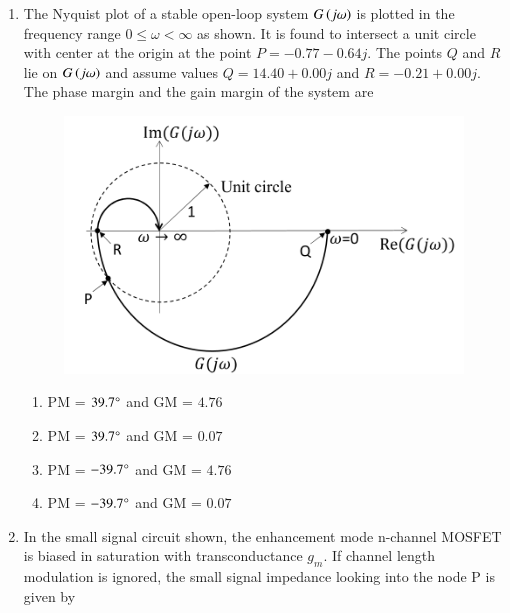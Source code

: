 \documentclass[journal,12pt,onecolumn]{IEEEtran}
\theoremstyle{remark}
\begin{document}
\begin{enumerate}
\item The Nyquist plot of a stable open-loop system $G\left(j\omega\right)$ is plotted in the frequency range $0 \le \omega < \infty$ as shown. It is found to intersect a unit circle with center at the origin at the point $P = -0.77 - 0.64j$. The points $Q$ and $R$ lie on $G\left(j\omega\right)$ and assume values $Q = 14.40 + 0.00j$ and $R = -0.21 + 0.00j$. The phase margin  and the gain margin  of the system are \underline{\hspace{2cm}}

\hfill{}
\begin{figure}[H]
\includegraphics[width = 0.5\columnwidth]{q43}
\caption*{}
\label{q43}
\end{figure}
\begin{enumerate}
\item PM = $39.7\degree$ and GM = $4.76$
\item PM = $39.7\degree$ and GM = $0.07$
\item PM = $-39.7\degree$ and GM = $4.76$
\item PM = $-39.7\degree$ and GM = $0.07$
\end{enumerate}

\item In the small signal circuit shown, the enhancement mode n-channel MOSFET is biased in saturation with transconductance $g_m$. If channel length modulation is ignored, the small signal impedance looking into the node P is given by \underline{\hspace{2cm}}


\end{enumerate}
\end{document}
